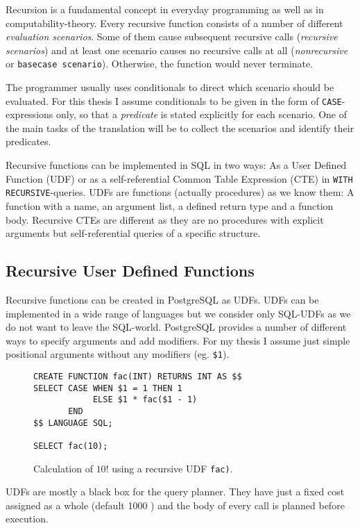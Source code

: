 Recursion is a fundamental concept in everyday programming as well as in computability-theory. Every recursive function consists of a number of different \textit{evaluation scenarios}. Some of them cause subsequent recursive calls (\textit{recursive scenarios}) and at least one scenario causes no recursive calls at all (\textit{nonrecursive} or \texttt{basecase scenario}). Otherwise, the function would never terminate.

The programmer usually uses conditionals to direct which scenario should be evaluated. For this thesis I assume conditionals to be given in the form of \texttt{CASE}-expressions only, so that a \textit{predicate} is stated explicitly for each scenario. One of the main tasks of the translation will be to collect the scenarios and identify their predicates.

Recursive functions can be implemented in SQL in two ways: As a User Defined Function (UDF) or as a self-referential Common Table Expression (CTE) in \texttt{WITH RECURSIVE}-queries. UDFs are functions (actually procedures) as we know them: A function with a name, an argument list, a defined return type and a function body. Recursive CTEs are different as they are no procedures with explicit arguments but self-referential queries of a specific structure.

\subsection{Recursive User Defined Functions}
Recursive functions can be created in PostgreSQL as UDFs. UDFs can be implemented in a wide range of languages but we consider only SQL-UDFs as we do not want to leave the SQL-world. PostgreSQL provides a number of different ways to specify arguments and add modifiers. For my thesis I assume just simple positional arguments without any modifiers (eg. \texttt{\$1}).

\begin{figure}[h!]
    \centering
    \begin{verbatim}
CREATE FUNCTION fac(INT) RETURNS INT AS $$
SELECT CASE WHEN $1 = 1 THEN 1
            ELSE $1 * fac($1 - 1)
       END
$$ LANGUAGE SQL;

SELECT fac(10);
    \end{verbatim}
    \caption{Calculation of $10!$ using a recursive UDF \texttt{fac)}.}
    \label{fig:my_label}
\end{figure}

UDFs are mostly a black box for the query planner. They have just a fixed cost assigned as a whole (default 1000 \cite[p. 1435]{psql}) and the body of every call is planned before execution.

